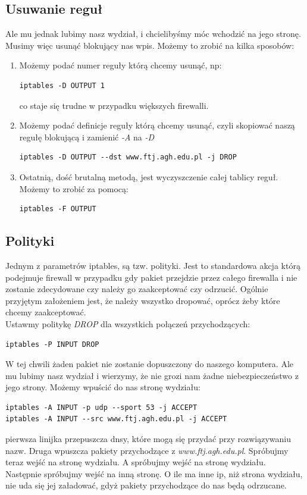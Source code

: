 \documentclass[a4paper,11pt]{article}
\begin{document}
\subsection{Usuwanie reguł}
Ale mu jednak lubimy nasz wydział, i chcielibyśmy móc wchodzić na jego stronę. Musimy więc usunąć blokujący nas wpis. Możemy to zrobić na kilka sposobów:
\begin{enumerate}
\item Możemy podać numer reguły którą chcemy usunąć, np:
\begin{verbatim}
iptables -D OUTPUT 1
\end{verbatim}
co staje się trudne w przypadku większych firewalli.
\item Możemy podać definicje reguły którą chcemy usunąć, czyli skopiować naszą regułę blokującą i zamienić \textit{-A} na \textit{-D}
\begin{verbatim}
iptables -D OUTPUT --dst www.ftj.agh.edu.pl -j DROP
\end{verbatim}
\item Ostatnią, dość brutalną metodą, jest wyczyszczenie całej tablicy reguł. Możemy to zrobić za pomocą:
\begin{verbatim}
iptables -F OUTPUT
\end{verbatim}
\end{enumerate}
\subsection{Polityki}
Jednym z parametrów iptables, są tzw. polityki. Jest to standardowa akcja którą podejmuje firewall w przypadku gdy pakiet przejdzie przez całego firewalla i nie zostanie zdecydowane czy należy go zaakceptować czy odrzucić. Ogólnie przyjętym założeniem jest, że należy wszystko dropować, oprócz żeby które chcemy zaakceptować.\\
Ustawmy politykę \textit{DROP} dla wszystkich połączeń przychodzących:
\begin{verbatim}
iptables -P INPUT DROP
\end{verbatim}
W tej chwili żaden pakiet nie zostanie dopuszczony do naszego komputera. Ale mu lubimy nasz wydział i wierzymy, że nie grozi nam żadne niebezpieczeństwo z jego strony. Możemy wpuścić do nas stronę wydziału:
\begin{verbatim}
iptables -A INPUT -p udp --sport 53 -j ACCEPT
iptables -A INPUT --src www.ftj.agh.edu.pl -j ACCEPT
\end{verbatim}
pierwsza linijka przepuszcza dnsy, które mogą się przydać przy rozwiązywaniu nazw. Druga wpuszcza pakiety przychodzące z \textit{www.ftj.agh.edu.pl}. Spróbujmy teraz wejść na stronę wydziału. A spróbujmy wejść na stronę wydziału.\\
Następnie spróbujmy wejść na inną stronę. O ile ma inne ip, niż strona wydziału, nie uda się jej załadować, gdyż pakiety przychodzące do nas będą odrzucane.
\end{document}
